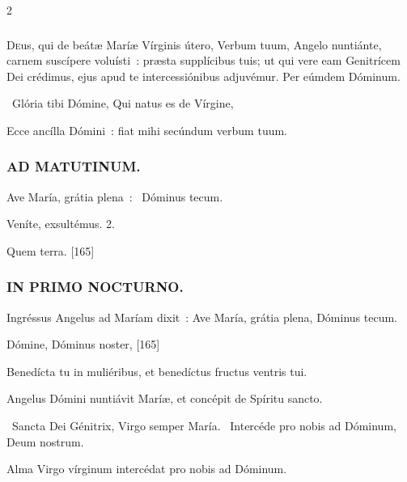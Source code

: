 \documentclass[9pt,twoside]{extarticle}
\begin{document}
\begin{multicols}{2}
\subsubsection*{\center {}}
\lettrine{D}eus, qui de beátæ Maríæ Vírginis útero, Verbum tuum, Angelo nuntiánte, carnem suscípere voluísti~: præsta supplícibus tuis; ut qui vere eam Genitrícem Dei crédimus, ejus apud te intercessiónibus adjuvémur. Per eúmdem Dóminum.

\begin{tightlist}{}
\item {}~Glória tibi Dómine, Qui natus es de Vírgine, 
\item {} Ecce ancílla Dómini~: fiat mihi secúndum verbum tuum.
\end{tightlist}

\subsubsection*{\center \textsc{AD MATUTINUM.}}
\begin{tightlist}{}
\item {} Ave María, grátia plena~: \textred{*}~Dóminus tecum.
\item {} Veníte, exsultémus. 2.
\item {} Quem terra. [165]
\end{tightlist}

\subsubsection*{\center \textsc{IN PRIMO NOCTURNO.}}
\begin{tightlist}{}
\item {} Ingréssus Angelus ad Maríam dixit~: Ave María, grátia plena, Dóminus tecum.
\item {} Dómine, Dóminus noster,  [165]
\item {} Benedícta tu in muliéribus, et benedíctus fructus ventris tui.
\item {} Angelus Dómini nuntiávit Maríæ, et concépit de Spíritu sancto.
\item {}~Sancta Dei Génitrix, Virgo semper María. ~Intercéde pro nobis ad Dóminum, Deum nostrum.
\item {}
\item {\small {} Alma Virgo vírginum intercédat pro nobis ad Dóminum.}
\end{tightlist}


\end{multicols}
\end{document}
